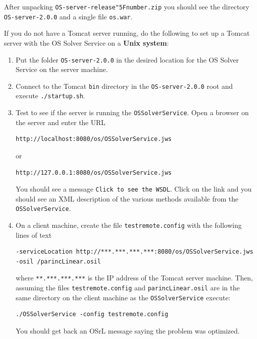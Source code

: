 \documentclass[11pt]{article}
\renewcommand{\_}{{\char"5F}}
\renewcommand{\{}{{\char"7B}}
\renewcommand{\}}{{\char"7D}}
\renewcommand{\^}{{\char"0D}}
\renewcommand{\'}{{\char"0D}}
\begin{document}
\begin{enumerate}[Step 1:]
After unpacking
{\tt OS-server-release\_number.zip} you should see the  directory {\tt OS-server-2.0.0} and a single file {\tt os.war}.

If you do not have a Tomcat server running, do the following to set up a  Tomcat server
with the OS Solver Service on a {\bf Unix system}:

\begin{enumerate}[Step 1.]
\item{}  Put the folder  {\tt OS-server-2.0.0}   in the desired location for the OS Solver Service on the server machine.

\item{} Connect to the Tomcat {\tt bin} directory in the {\tt OS-server-2.0.0} root and execute {\tt ./startup.sh}.

\item{} \label{itemize:tomcatunix3}
Test to see if the server is running the {\tt OSSolverService}.  Open a browser on the server and enter the URL
\begin{verbatim}
http://localhost:8080/os/OSSolverService.jws
\end{verbatim}
or
\begin{verbatim}
http://127.0.0.1:8080/os/OSSolverService.jws
\end{verbatim}
You should see a message {\tt Click to see the WSDL}.  Click on the link and you should see an XML description of
the various methods available from the {\tt OSSolverService}.

\item{}  \label{itemize:tomcatunix4}
On a client machine, create  the file {\tt testremote.config} with the following lines of text
\begin{verbatim}
-serviceLocation http://***.***.***.***:8080/os/OSSolverService.jws
-osil /parincLinear.osil
\end{verbatim}
where {\tt ***.***.***.***} is the IP address of the Tomcat server machine. Then, assuming the files
{\tt testremote.config} and {\tt parincLinear.osil} are in the same directory on the client machine as the
{\tt OSSolverService} execute:
\begin{verbatim}
./OSSolverService -config testremote.config
\end{verbatim}
You should get back an OSrL message saying the problem was optimized.

\end{enumerate}


\end{enumerate}
\end{document}
